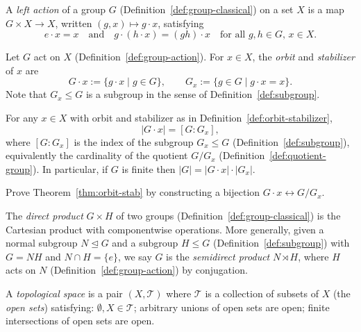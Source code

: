 \begin{definition}
\label{def:group-action}
A \emph{left action} of a group $G$ (Definition~\ref{def:group-classical}) on a set $X$ is a map $G \times X \to X$, written $(g, x) \mapsto g \cdot x$, satisfying
\[
  e \cdot x = x \quad \text{and} \quad g \cdot (h \cdot x) = (gh) \cdot x \quad \text{for all } g,h \in G,\, x \in X.
\]
\end{definition}

\begin{definition}
\label{def:orbit-stabilizer}
Let $G$ act on $X$ (Definition~\ref{def:group-action}).
For $x \in X$, the \emph{orbit} and \emph{stabilizer} of $x$ are
\[
  G \cdot x := \{ g \cdot x \mid g \in G \}, \qquad
  G_x := \{ g \in G \mid g \cdot x = x \}.
\]
Note that $G_x \leq G$ is a subgroup in the sense of Definition~\ref{def:subgroup}.
\end{definition}

\begin{theorem}
\label{thm:orbit-stab}
For any $x \in X$ with orbit and stabilizer as in Definition~\ref{def:orbit-stabilizer},
\[
  |G \cdot x| = [G : G_x],
\]
where $[G : G_x]$ is the index of the subgroup $G_x \leq G$ (Definition~\ref{def:subgroup}), equivalently the cardinality of the quotient $G/G_x$ (Definition~\ref{def:quotient-group}).
In particular, if $G$ is finite then $|G| = |G \cdot x| \cdot |G_x|$.
\end{theorem}

\begin{exercise}
Prove Theorem~\ref{thm:orbit-stab} by constructing a bijection $G \cdot x \leftrightarrow G/G_x$.
\end{exercise}

\begin{definition}
\label{def:direct-semidirect}
The \emph{direct product} $G \times H$ of two groups (Definition~\ref{def:group-classical}) is the Cartesian product with componentwise operations.
More generally, given a normal subgroup $N \trianglelefteq G$ and a subgroup $H \leq G$ (Definition~\ref{def:subgroup}) with $G = NH$ and $N \cap H = \{e\}$,
we say $G$ is the \emph{semidirect product} $N \rtimes H$, where $H$ acts on $N$ (Definition~\ref{def:group-action}) by conjugation.
\end{definition}

\begin{definition}
\label{def:topological-space}
A \emph{topological space} is a pair $(X, \mathcal{T})$ where $\mathcal{T}$ is a collection of subsets of $X$ (the \emph{open sets}) satisfying: $\emptyset, X \in \mathcal{T}$; arbitrary unions of open sets are open; finite intersections of open sets are open.
\end{definition}

